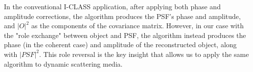 \documentclass[12pt]{article}
\newenvironment{ourresponse}
    {\begin{tcolorbox}[width=\linewidth,breakable,enhanced,colback=gray!5,colframe=responsecolor!50,title=Response,left=5pt,right=5pt]}
    {\end{tcolorbox}}
\begin{document}
\begin{ourresponse}
In the conventional I-CLASS application, after applying both phase and amplitude corrections, the algorithm produces the PSF's phase and amplitude, and $|O|^2$ as the components of the covariance matrix. However, in our case with the "role exchange" between object and PSF, the algorithm instead produces the phase (in the coherent case) and amplitude of the reconstructed object, along with $|PSF|^2$. This role reversal is the key insight that allows us to apply the same algorithm to dynamic scattering media.

\end{ourresponse}





\end{document}
